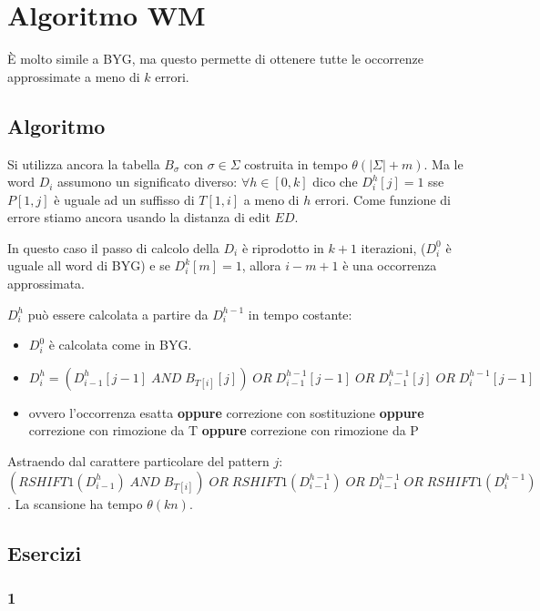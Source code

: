 \chapter{Algoritmo WM}

\`E molto simile a BYG, ma questo permette di ottenere tutte le occorrenze approssimate a meno di $k$ errori.

\section{Algoritmo}

Si utilizza ancora la tabella $B_{\sigma}$ con $\sigma \in \Sigma$ costruita in tempo $\theta(|\Sigma|+m)$. Ma le word $D_i$ assumono un significato diverso: $\forall h \in [0, k]$ dico che $D^h_i[j] = 1$ sse $P[1,j]$ \`e uguale ad un suffisso di $T[1,i]$ a meno di $h$ errori. Come funzione di errore stiamo ancora usando la distanza di edit $ED$.

In questo caso il passo di calcolo della $D_i$ \`e riprodotto in $k+1$ iterazioni, ($D^0_i$ \`e uguale all word di BYG) e se $D^k_i[m] = 1$, allora $i-m+1$ \`e una occorrenza approssimata.

$D^h_i$ pu\`o essere calcolata a partire da $D^{h-1}_i$ in tempo costante:

\begin{itemize}
  \item $D^0_i$ \`e calcolata come in BYG.
  \item $D^h_i = (D^h_{i-1}[j-1] \; AND \; B_{T[i]}[j]) \; OR \; D^{h-1}_{i-1}[j-1] \; OR \; D^{h-1}_{i-1}[j] \; OR \; D^{h-1}_{i}[j-1]$
  \item ovvero l'occorrenza esatta \textbf{oppure} correzione con sostituzione \textbf{oppure} correzione con rimozione da T \textbf{oppure} correzione con rimozione da P
\end{itemize}

Astraendo dal carattere particolare del pattern $j$:\\ $(RSHIFT1(D^h_{i-1}) \; AND \; B_{T[i]}) \; OR \; RSHIFT1(D^{h-1}_{i-1}) \; OR \; D^{h-1}_{i-1} \; OR \; RSHIFT1(D^{h-1}_i)$.
La scansione ha tempo $\theta(kn)$.

\section{Esercizi}

\subsection{1}

